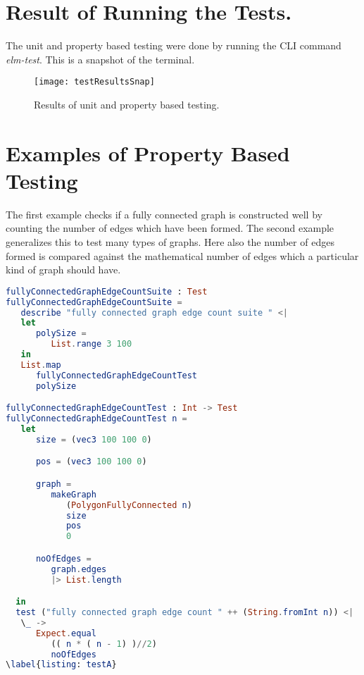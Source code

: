 \graphicspath{ {images/} }

\section{ Result of Running the Tests.}
\label{testing: results}
The unit and property based testing were done by running the CLI command \emph{elm-test}.
This is a snapshot of the terminal.

\begin{figure}[!ht]
\centering
\texttt{[image: testResultsSnap]}
\caption{
        Results of unit and property based testing.
        }
\end{figure}

\section{Examples of Property Based Testing}
\label{testing: pbtExamples}
The first example checks if a fully connected graph is constructed well by
counting the number of edges which have been formed. The second example
generalizes this to test many types of graphs. Here also the number of edges
formed is compared against the mathematical number of edges which a particular
kind of graph should have.

\begin{lstlisting}[language=elm
                  , caption={
                  Property Based Testing of construction of a fully
                  connected graph.
                  }
                  ]
fullyConnectedGraphEdgeCountSuite : Test         
fullyConnectedGraphEdgeCountSuite =
   describe "fully connected graph edge count suite " <|
   let
      polySize =
         List.range 3 100
   in
   List.map
      fullyConnectedGraphEdgeCountTest         
      polySize

fullyConnectedGraphEdgeCountTest : Int -> Test         
fullyConnectedGraphEdgeCountTest n =
   let
      size = (vec3 100 100 0)

      pos = (vec3 100 100 0)

      graph =
         makeGraph
            (PolygonFullyConnected n)
            size
            pos
            0

      noOfEdges =
         graph.edges
         |> List.length

  in
  test ("fully connected graph edge count " ++ (String.fromInt n)) <|
   \_ ->
      Expect.equal 
         (( n * ( n - 1) )//2)
         noOfEdges
\label{listing: testA}
\end{lstlisting}

